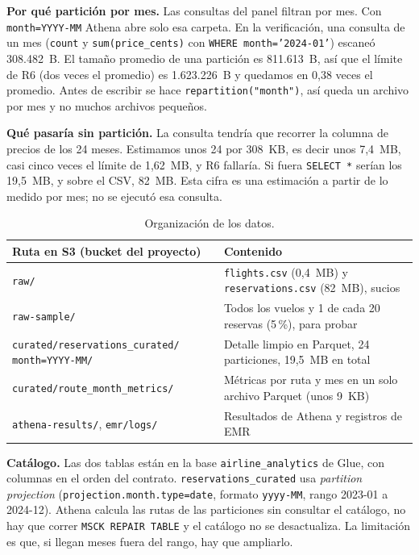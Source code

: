 \documentclass[11pt,letterpaper]{article}
\begin{document}
\textbf{Por qué partición por mes.} Las consultas del panel filtran por mes. Con \texttt{month=YYYY-MM} Athena abre solo esa carpeta. En la verificación, una consulta de un mes (\texttt{count} y \texttt{sum(price\_cents)} con \texttt{WHERE month='2024-01'}) escaneó 308.482~B. El tamaño promedio de una partición es 811.613~B, así que el límite de R6 (dos veces el promedio) es 1.623.226~B y quedamos en 0,38 veces el promedio. Antes de escribir se hace \texttt{repartition("month")}, así queda un archivo por mes y no muchos archivos pequeños.

\textbf{Qué pasaría sin partición.} La consulta tendría que recorrer la columna de precios de los 24 meses. Estimamos unos 24 por 308~KB, es decir unos 7,4~MB, casi cinco veces el límite de 1,62~MB, y R6 fallaría. Si fuera \texttt{SELECT *} serían los 19,5~MB, y sobre el CSV, 82~MB. Esta cifra es una estimación a partir de lo medido por mes; no se ejecutó esa consulta.

\begin{table}[H]
\centering
\begin{tabular}{L{7.4cm} L{6.6cm}}
\toprule
\textbf{Ruta en S3 (bucket del proyecto)} & \textbf{Contenido} \\
\midrule
\texttt{raw/} & \texttt{flights.csv} (0,4~MB) y \texttt{reservations.csv} (82~MB), sucios \\
\texttt{raw-sample/} & Todos los vuelos y 1 de cada 20 reservas (5\,\%), para probar \\
\texttt{curated/reservations\_curated/} \texttt{month=YYYY-MM/} & Detalle limpio en Parquet, 24 particiones, 19,5~MB en total \\
\texttt{curated/route\_month\_metrics/} & Métricas por ruta y mes en un solo archivo Parquet (unos 9~KB) \\
\texttt{athena-results/}, \texttt{emr/logs/} & Resultados de Athena y registros de EMR \\
\bottomrule
\end{tabular}
\caption{Organización de los datos.}
\end{table}

\textbf{Catálogo.} Las dos tablas están en la base \texttt{airline\_analytics} de Glue, con columnas en el orden del contrato. \texttt{reservations\_curated} usa \emph{partition projection} (\texttt{projection.month.type=date}, formato \texttt{yyyy-MM}, rango 2023-01 a 2024-12). Athena calcula las rutas de las particiones sin consultar el catálogo, no hay que correr \texttt{MSCK REPAIR TABLE} y el catálogo no se desactualiza. La limitación es que, si llegan meses fuera del rango, hay que ampliarlo.
\end{document}

